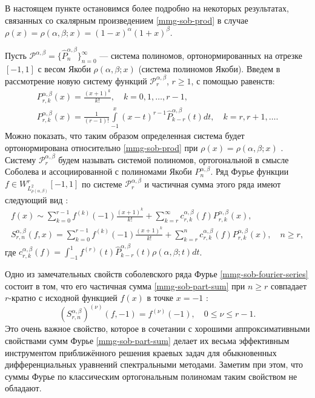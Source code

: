 В настоящем пункте остановимся более подробно на некоторых результатах, связанных со скалярным произведением \eqref{mmg-sob-prod} в случае $\rho(x)=\rho(\alpha,\beta; x)=(1-x)^\alpha(1+x)^\beta$.

Пусть $\mathcal{P}^{\alpha,\beta}=\{ \hat{P}_n^{\alpha,\beta} \}_{n=0}^\infty$ --- система полиномов, ортонормированных на отрезке $[-1,1]$ с весом Якоби $\rho(\alpha,\beta; x)$ (система полиномов Якоби). Введем в рассмотрение новую систему функций $\mathcal{P}^{\alpha,\beta}_r$, $r \ge 1$, с помощью равенств:
\begin{gather}
	\label{mmg-sob-def1}
	P_{r,k}^{\alpha,\beta}(x) =\frac{(x+1)^k}{k!}, \quad k=0,1,\ldots, r-1,\\
	\label{mmg-sob-def2}
	P_{r,k}^{\alpha,\beta}(x) =\frac{1}{(r-1)!}\int\limits_{-1}^x(x-t)^{r-1}\hat{P}_{k-r}^{\alpha,\beta}(t)dt, \quad k=r,r+1,\ldots.
\end{gather}
Можно показать, что таким образом определенная система будет ортонормирована относительно \eqref{mmg-sob-prod} при $\rho(x)=\rho(\alpha,\beta; x)$ \cite[с.~231]{mmg-Shii-izvran2018}. Систему $\mathcal{P}_r^{\alpha,\beta}$ будем называть системой полиномов, ортогональной в смысле Соболева и ассоциированной с полиномами Якоби $P_n^{\alpha,\beta}$.
Ряд Фурье функции $f \in W^r_{L^2_{\rho(\alpha,\beta)}}[-1,1]$ по системе $\mathcal{P}_r^{\alpha,\beta}$ и частичная сумма этого ряда имеют следующий вид \cite[с.~227]{mmg-Shii-izvran2018}:
\begin{gather}
	\label{mmg-sob-fourier-series}
	f(x) \sim \sum_{k=0}^{r-1} f^{(k)}(-1)\frac{(x+1)^k}{k!}+ \sum_{k=r}^\infty c^{\alpha,\beta}_{r,k}(f) P_{r,k}^{\alpha,\beta}(x),\\
	\label{mmg-sob-part-sum}
	S^{\alpha,\beta}_{r,n}(f,x) = \sum_{k=0}^{r-1} f^{(k)}(-1)\frac{(x+1)^k}{k!}+ \sum_{k=r}^n c^{\alpha,\beta}_{r,k}(f) P_{r,k}^{\alpha,\beta}(x), \quad n \ge r,
\end{gather}
где $c^{\alpha,\beta}_{r,k}(f)=\int_{-1}^1 f^{(r)}(t)\hat{P}_{k-r}^{\alpha,\beta}(t)\rho(\alpha,\beta; t)dt$.

Одно из замечательных свойств соболевского ряда Фурье \eqref{mmg-sob-fourier-series} состоит в том, что его частичная сумма \eqref{mmg-sob-part-sum} при $n \ge r$ совпадает $r$-кратно с исходной функцией $f(x)$ в точке $x=-1$ \cite[с. 228]{mmg-Shii-izvran2018}:
\begin{equation}\label{mmg-sob-part-sum-coins}
	(S^{\alpha,\beta}_{r,n})^{(\nu)}(f,-1)=f^{(\nu)}(-1), \quad 0\le\nu\le r-1.
\end{equation}
Это очень важное свойство, которое в сочетании с хорошими аппроксимативными свойствами сумм Фурье \eqref{mmg-sob-part-sum}
делает их весьма эффективным инструментом приближённого решения краевых задач для обыкновенных дифференциальных уравнений спектральными методами. Заметим при этом, что суммы Фурье по классическим ортогональным полиномам таким свойством не обладают.

